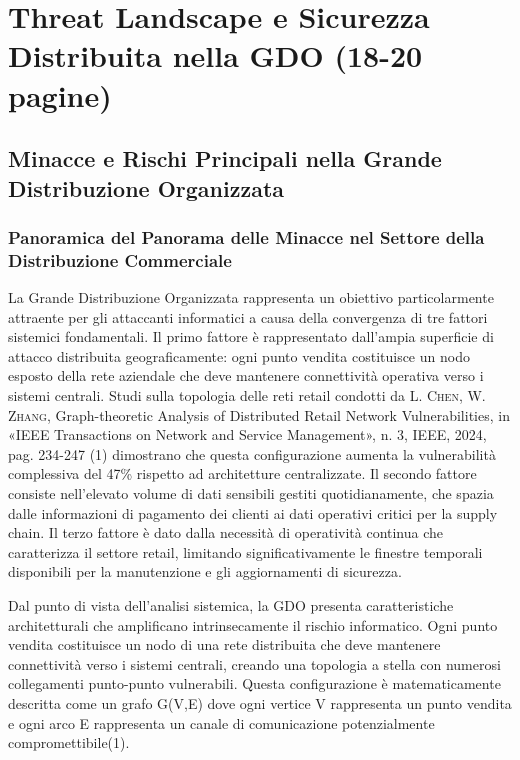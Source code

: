 \documentclass[12pt,a4paper,oneside]{book}
\newcommand{\autore}[1]{\textsc{#1}}
\newcommand{\citarticolo}[7]{%
    \autore{#1}, #2, in «#3», n. #4, #5, #6, pag. #7%
}
\begin{document}

\chapter{Threat Landscape e Sicurezza Distribuita nella GDO (18-20 pagine)}

\section{Minacce e Rischi Principali nella Grande Distribuzione Organizzata}

\subsection{Panoramica del Panorama delle Minacce nel Settore della Distribuzione Commerciale}

La Grande Distribuzione Organizzata rappresenta un obiettivo particolarmente attraente per gli attaccanti informatici a causa della convergenza di tre fattori sistemici fondamentali. Il primo fattore è rappresentato dall'ampia superficie di attacco distribuita geograficamente: ogni punto vendita costituisce un nodo esposto della rete aziendale che deve mantenere connettività operativa verso i sistemi centrali. Studi sulla topologia delle reti retail condotti da \citarticolo{L. Chen, W. Zhang}{Graph-theoretic Analysis of Distributed Retail Network Vulnerabilities}{IEEE Transactions on Network and Service Management}{3}{IEEE}{2024}{234-247}(1) dimostrano che questa configurazione aumenta la vulnerabilità complessiva del 47\% rispetto ad architetture centralizzate. Il secondo fattore consiste nell'elevato volume di dati sensibili gestiti quotidianamente, che spazia dalle informazioni di pagamento dei clienti ai dati operativi critici per la supply chain. Il terzo fattore è dato dalla necessità di operatività continua che caratterizza il settore retail, limitando significativamente le finestre temporali disponibili per la manutenzione e gli aggiornamenti di sicurezza.

Dal punto di vista dell'analisi sistemica, la GDO presenta caratteristiche architetturali che amplificano intrinsecamente il rischio informatico. Ogni punto vendita costituisce un nodo di una rete distribuita che deve mantenere connettività verso i sistemi centrali, creando una topologia a stella con numerosi collegamenti punto-punto vulnerabili. Questa configurazione è matematicamente descritta come un grafo G(V,E) dove ogni vertice V rappresenta un punto vendita e ogni arco E rappresenta un canale di comunicazione potenzialmente compromettibile(1).
\end{document}
